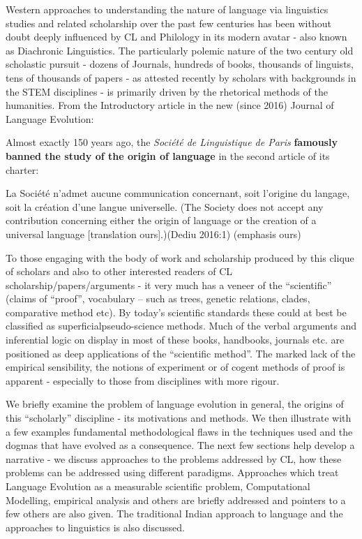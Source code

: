 Western approaches to understanding the nature of language via linguistics studies and related scholarship over the past few centuries has been without doubt deeply influenced by CL and Philology in its modern avatar - also known as Diachronic Linguistics. The particularly polemic nature of the two century old scholastic pursuit - dozens of Journals, hundreds of books, thousands of linguists, tens of thousands of papers - as attested\endnote{} recently by scholars with backgrounds in the STEM disciplines - is primarily driven by the rhetorical methods of the humanities. From the Introductory article in the new (since 2016) Journal of Language Evolution:

\vskip 6pt

\begin{myquote}
Almost exactly 150 years ago, the \textit{Société de Linguistique de Paris} \textbf{famously banned the study of the origin of language} in the second article of its charter:
\end{myquote}

\vskip 2pt

\begin{myquote}
La Société n’admet aucune communication concernant, soit l’origine du langage, soit la création d’une langue universelle. (The Society does not accept any contribution concerning either the origin of language or the creation of a universal language [translation ours].)(Dediu 2016:1) (emphasis ours)
\end{myquote}

\vskip 3pt

To those engaging with the body of work and scholarship produced by this clique of scholars and also to other interested readers of CL scholarship/papers/arguments - it very much has a veneer of the “scientific” (claims of “proof”, vocabulary – such as trees, genetic relations, clades, comparative method etc). By today’s scientific standards these could at best be classified as superficialpseudo-science methods. Much of the verbal arguments and inferential logic on display in most of these books, handbooks, journals etc. are positioned as deep applications of the “scientific method”. The marked lack of the empirical sensibility, the notions of experiment or of cogent methods of proof is apparent - especially to those from disciplines with more rigour.

We briefly examine the problem of language evolution in general, the origins of this “scholarly” discipline - its motivations and methods. We then illustrate with a few examples fundamental methodological flaws in the techniques used and the dogmas that have evolved as a consequence. The next few sections help develop a narrative - we discuss approaches to the problems addressed by CL, how these problems can be addressed using different paradigms. Approaches which treat Language Evolution as a measurable scientific problem, Computational Modelling, empirical analysis and others are briefly addressed and pointers to a few others are also given. The traditional Indian approach to language and the approaches to linguistics is also discussed.

